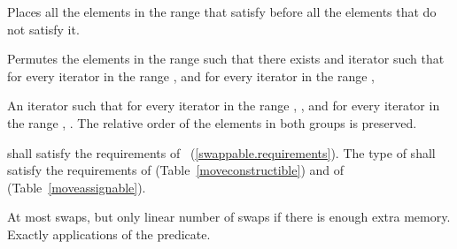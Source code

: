 \begin{itemdescr}
\pnum
\begin{removedblock}
\effects
Places all the elements in the range
that satisfy  before all the
elements that do not satisfy it.
\end{removedblock}

\begin{addedblock}
\effects Permutes the elements in the range  such that there exists and iterator 
such that for every iterator  in the range 
, and for every iterator  in the
range , 
\end{addedblock}

\pnum
\returns
An iterator
such that for every iterator
in the range
,
,
and for every iterator
in the range
,
.
The relative order of the elements in both groups is preserved.

\begin{removedblock}
\pnum
\requires
{} shall satisfy the requirements of
~(\ref{swappable.requirements}). The type
of  shall satisfy the requirements of
 (Table~\ref{moveconstructible}) and of
 (Table~\ref{moveassignable}).
\end{removedblock}

\pnum
\complexity
At most
swaps, but only linear number of swaps if there is enough extra memory.
Exactly
applications of the predicate.
\end{itemdescr}

